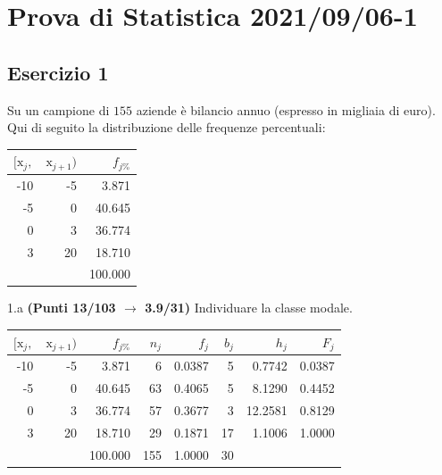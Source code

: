 \documentclass[
  11pt,
]{book}
\theoremstyle{mytheoremstyle}
\theoremstyle{mydefstyle}
\newenvironment{sol}
  {
  \begin{tcolorbox}[enhanced,breakable,arc=0.1mm,boxrule=1pt,colback=white,colframe=iblue,
  title=\bf \fontfamily{lmss}\selectfont \hspace{.5 cm} Soluzione,drop fuzzy shadow]

}{
\end{tcolorbox}
  }
\begin{document}
\section{Prova di Statistica 2021/09/06-1}\label{prova-di-statistica-20210906-1}

\subsection{Esercizio 1}\label{esercizio-1-9}

Su un campione di \(155\) aziende è bilancio annuo (espresso in migliaia di euro). Qui di seguito la distribuzione delle frequenze percentuali:

\begin{table}[H]
\centering
\begin{tabular}{rrr}
\toprule
$[\text{x}_j,$ & $\text{x}_{j+1})$ & $f_{j\%}$\\
\midrule
-10 & -5 & 3.871\\
-5 & 0 & 40.645\\
0 & 3 & 36.774\\
3 & 20 & 18.710\\
 &  & 100.000\\
\bottomrule
\end{tabular}
\end{table}

1.a \textbf{(Punti 13/103 \(\rightarrow\) 3.9/31)} Individuare la classe modale.

\begin{sol}

\begin{table}[H]
\centering
\begin{tabular}{rrrrrrrr}
\toprule
$[\text{x}_j,$ & $\text{x}_{j+1})$ & $f_{j\%}$ & $n_j$ & $f_j$ & $b_j$ & $h_j$ & $F_j$\\
\midrule
-10 & -5 & 3.871 & 6 & 0.0387 & 5 & 0.7742 & 0.0387\\
-5 & 0 & 40.645 & 63 & 0.4065 & 5 & 8.1290 & 0.4452\\
0 & 3 & 36.774 & 57 & 0.3677 & 3 & 12.2581 & 0.8129\\
3 & 20 & 18.710 & 29 & 0.1871 & 17 & 1.1006 & 1.0000\\
 &  & 100.000 & 155 & 1.0000 & 30 &  & \\
\bottomrule
\end{tabular}
\end{table}

\end{sol}
\end{document}

